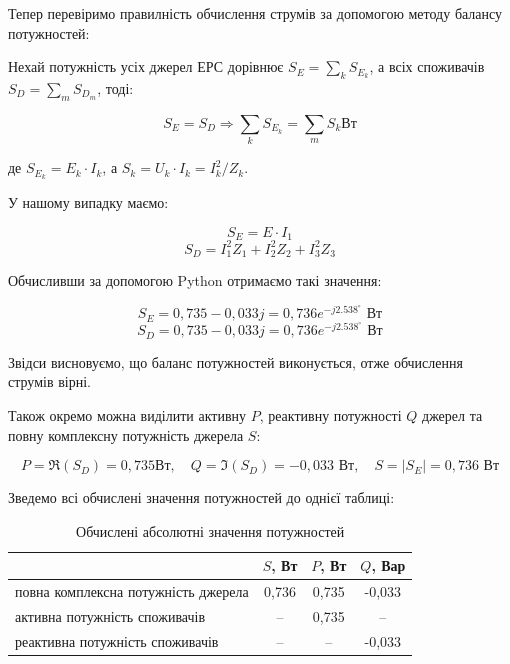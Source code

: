 \documentclass[12pt,a4paper]{article}
\begin{document}
    Тепер перевіримо правилність обчислення струмів за допомогою методу балансу потужностей:

    Нехай потужність усіх джерел ЕРС дорівнює $S_E = \sum_k S_{E_k}$, а всіх споживачів $S_D = \sum_m S_{D_m}$, тоді:

    \[
    S_E = S_D \Rightarrow \sum_k S_{E_k} = \sum_m S_k \text{Вт}
    \]

    де $S_{E_k} = E_k \cdot I_k$, а $S_k = U_k \cdot I_k = I^2_k / Z_k$.

    У нашому випадку маємо:

    \[
    S_E = E \cdot I_1
    \]
    \[
    S_D = I_1^2 Z_1 + I_2^2 Z_2 + I_3^2 Z_3
    \]

    Обчисливши за допомогою Python отримаємо такі значення:

    \[
    S_E = 0{,}735 - 0{,}033j = 0{,}736 e^{-j2.538^\circ} \text{ Вт}
    \]
    \[
    S_D = 0{,}735 - 0{,}033j = 0{,}736 e^{-j2.538^\circ} \text{ Вт}
    \]

    Звідси висновуємо, що баланс потужностей виконується, отже обчислення струмів вірні.

    Також окремо можна виділити активну $P$, реактивну потужності $Q$ джерел та повну комплексну потужність джерела $S$:

    \[
    P = \Re (S_D) = 0{,}735 \text{Вт}, \quad Q = \Im (S_D) = -0{,}033 \text{ Вт}, \quad S = \left| S_E \right| = 0{,}736 \text{ Вт}
    \]

    Зведемо всі обчислені значення потужностей до однієї таблиці:

    \newcommand{\g}{\cellcolor[gray]{0.85}} %

    \begin{table}[h]
    \renewcommand{\arraystretch}{1.35}
    \setlength{\tabcolsep}{8pt}
    \centering
    \begin{tabular}{|>{\raggedright\arraybackslash}p{7.8cm}|c|c|c|}
    \hline
    & $S$, Вт & $P$, Вт & $Q$, Вар \\
    \cline{2-4}
    \hline
    повна комплексна потужність джерела
    & 0{,}736 & 0{,}735 & -0{,}033 \\
    \hline
    активна потужність споживачів
    &  \g-- & 0{,}735 & \g-- \\
    \hline
    реактивна потужність споживачів
    &  \g-- & \g-- & -0{,}033 \\
    \hline
    \end{tabular}
    \caption{Обчислені абсолютні значення потужностей}
    \end{table}
    
\end{document}

